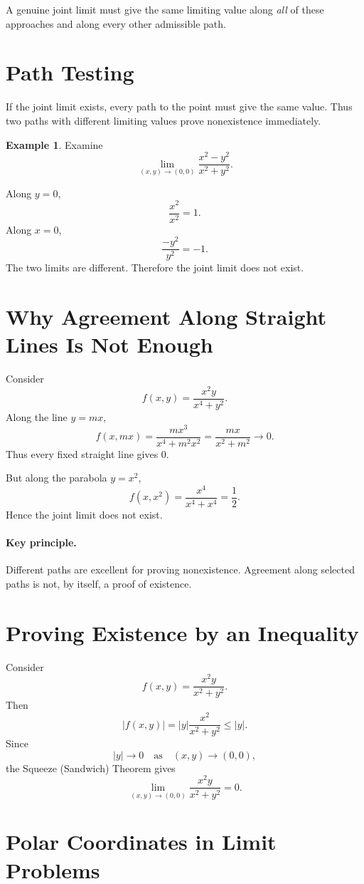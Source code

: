 \documentclass[11pt,oneside]{book}
\theoremstyle{studentthm}
\theoremstyle{definition}
\newtheorem{example}[theorem]{Example}
\newcommand{\abs}[1]{\left|#1\right|}
\begin{document}
A genuine joint limit must give the same limiting value along
\emph{all} of these approaches and along every other admissible path.


\section{Path Testing}

If the joint limit exists, every path to the point must give the same
value. Thus two paths with different limiting values prove
nonexistence immediately.

\begin{example}
Examine
\[
\lim_{(x,y)\to(0,0)}
\frac{x^2-y^2}{x^2+y^2}.
\]

Along \(y=0\),
\[
\frac{x^2}{x^2}=1.
\]
Along \(x=0\),
\[
\frac{-y^2}{y^2}=-1.
\]
The two limits are different. Therefore the joint limit does not
exist.
\end{example}

\section{Why Agreement Along Straight Lines Is Not Enough}

Consider
\[
f(x,y)
=
\frac{x^2y}{x^4+y^2}.
\]
Along the line \(y=mx\),
\[
f(x,mx)
=
\frac{mx^3}{x^4+m^2x^2}
=
\frac{mx}{x^2+m^2}
\longrightarrow0.
\]
Thus every fixed straight line gives \(0\).

But along the parabola \(y=x^2\),
\[
f(x,x^2)
=
\frac{x^4}{x^4+x^4}
=
\frac12.
\]
Hence the joint limit does not exist.

\paragraph{Key principle.}
Different paths are excellent for proving nonexistence. Agreement
along selected paths is not, by itself, a proof of existence.

\section{Proving Existence by an Inequality}

Consider
\[
f(x,y)=\frac{x^2y}{x^2+y^2}.
\]
Then
\[
\abs{f(x,y)}
=
\abs{y}\frac{x^2}{x^2+y^2}
\le\abs{y}.
\]
Since
\[
\abs{y}\to0
\quad\text{as}\quad
(x,y)\to(0,0),
\]
the Squeeze (Sandwich) Theorem gives
\[
\lim_{(x,y)\to(0,0)}
\frac{x^2y}{x^2+y^2}
=0.
\]

\section{Polar Coordinates in Limit Problems}
\end{document}
